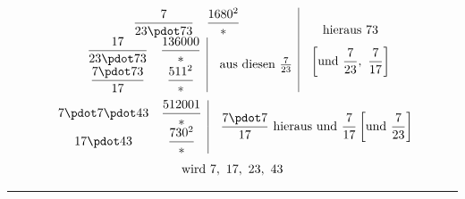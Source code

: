 \par{}%
\[
\begin{array}{c|}
\begin{array}{cc}\dfrac7{23\pdot73}&\dfrac{1680^2}{*}\end{array}\\[4pt]
\begin{array}{cc|}\dfrac{17}{23\pdot73}&\dfrac{136000}{*}\\[4pt]\dfrac{7\pdot73}{17}&\dfrac{511^2}{*}\end{array}\quad\text{aus diesen }\frac7{23}
\end{array}\quad\begin{gathered}\text{hieraus }73\\[3pt]\left[\text{und }\frac7{23},\ \frac7{17}\right]\end{gathered}
\]
\[
\begin{gathered}
\begin{array}{cc|}7\pdot7\pdot43&\dfrac{512001}{*}\\[4pt]17\pdot43&\dfrac{730^2}{*}\end{array}\quad
\frac{7\pdot7}{17}\ \text{hieraus und }\frac7{17}\left[\text{und }\frac7{23}\right]\\[3pt]
\text{wird }7,\ 17,\ 23,\ 43
\end{gathered}
\]\par\medskip\noindent\rule{.32\textwidth}{.3pt}
\begingroup\renewcommand{\arraystretch}{2.15}
